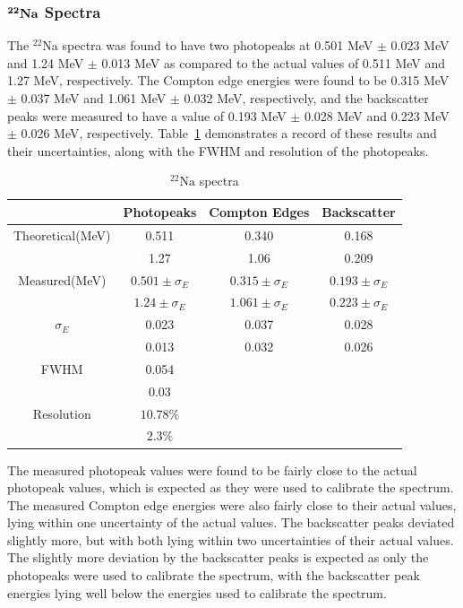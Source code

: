 \documentclass[%
 aip,
rsi,%
 amsmath,amssymb,
 reprint,%
author-numerical,%
]{revtex4-1}
\begin{document}
\subsubsection{$\bf{ ^ { 22 }Na }$ Spectra }
The $^ {22}$Na  spectra was found to have two photopeaks at 0.501 MeV $\pm$ 0.023 MeV and 1.24 MeV $\pm$ 0.013 MeV as compared to the actual values of 0.511 MeV and 1.27 MeV, respectively. The Compton edge energies were found to be 0.315 MeV $\pm$ 0.037 MeV and 1.061 MeV $\pm$ 0.032 MeV, respectively, and the backscatter peaks were measured to have a value of 0.193 MeV $\pm$ 0.028 MeV and 0.223 MeV $\pm$ 0.026 MeV, respectively. Table~\ref{tab:table3} demonstrates a record of these results and their uncertainties, along with the FWHM and resolution of the photopeaks.

\begin{table}[H]
\caption{\label{tab:table3}$\mathrm { ^ { 22 }Na }$ spectra }
\begin{ruledtabular}
\begin{tabular}{cccc}
&Photopeaks&Compton Edges&Backscatter\\
\hline
Theoretical(MeV)&0.511&0.340&0.168\\
&1.27&1.06 &0.209\\
\hline
Measured(MeV)&$0.501\pm\sigma_E$&$0.315\pm\sigma_E$&$0.193\pm\sigma_E$\\
&$1.24\pm\sigma_E$&$1.061\pm\sigma_E$&$0.223\pm\sigma_E$\\
\hline
$\sigma_E$ &0.023& 0.037 &0.028 \\
 &0.013& 0.032&0.026 \\
 \hline
FWHM &0.054&  & \\
&0.03&  & \\
\hline
Resolution &$10.78\%$ &  & \\
 &$2.3\%$ &  & \\
\end{tabular}
\end{ruledtabular}
\end{table}

The measured photopeak values were found to be fairly close to the actual photopeak values, which is expected as they were used to calibrate the spectrum. The measured Compton edge energies were also fairly close to their actual values, lying within one uncertainty of the actual values. The backscatter peaks deviated slightly more, but with both lying within two uncertainties of their actual values. The slightly more deviation by the backscatter peaks is expected as only the photopeaks were used to calibrate the spectrum, with the backscatter peak energies lying well below the energies used to calibrate the spectrum.
\end{document}
